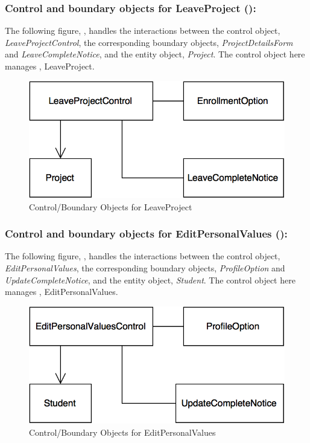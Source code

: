 \documentclass[12pt,letterpaper]{article}
\begin{document}
\newpage{}

\subsubsection*{Control and boundary objects for LeaveProject ():}

The following figure, , handles the interactions between the control object, {\it LeaveProjectControl}, the corresponding boundary objects, 
{\it ProjectDetailsForm} and {\it LeaveCompleteNotice}, and the entity object, {\it Project}. The control object here manages , LeaveProject.

\begin{figure}[H]
	\centering{}
	\includegraphics[scale=0.37]{imgs/cbod/leave-project.png}
	\caption{Control/Boundary Objects for LeaveProject}
\end{figure}

\subsubsection*{Control and boundary objects for EditPersonalValues ():}

The following figure, , handles the interactions between the control object, {\it EditPersonalValues}, the corresponding boundary objects, {\it ProfileOption} and {\it UpdateCompleteNotice}, and the entity object, {\it Student}. The control object here manages , EditPersonalValues.

\begin{figure}[H]
	\centering{}
	\includegraphics[scale=0.37]{imgs/cbod/edit-personal-values.png}
	\caption{Control/Boundary Objects for EditPersonalValues}
\end{figure}
\end{document}
